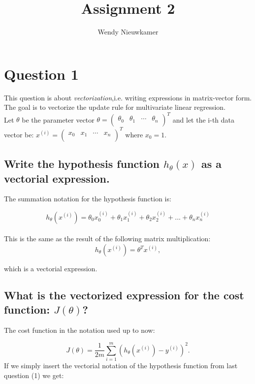 \documentclass{article}
\title {Assignment 2}
\date{}
\author{Wendy Nieuwkamer}
\begin{document}
\maketitle

\section{Question 1}
This question is about \textit{vectorization},i.e. writing expressions
in matrix-vector form. The goal is to vectorize the update rule
for multivariate linear regression.\\

Let $\theta$ be the parameter vector $\theta = \begin{pmatrix} \theta_0 & \theta_1 & \cdots & \theta_n \\ \end{pmatrix} ^T$ and let the i-th data vector be: $ x^{(i)} = \begin{pmatrix} x_0 & x_1 & \cdots & x_n \\\end{pmatrix}^T$ where $ x_0 = 1$.

\subsection{Write the hypothesis function $h_\theta(x)$ as a vectorial expression.}

The summation notation for the hypothesis function is:

\begin{equation*}
	h_\theta (x^{(i)}) = \theta_0 x_0^{(i)} + \theta_1 x_1^{(i)}+ \theta_2 x_2^{(i)}+ ... + \theta_n x_n^{(i)}
\end{equation*}\\

This is the same as the result of the following matrix multiplication:
\begin{equation}
	h_\theta (x^{(i)}) = \theta^T x^{(i)},
\end{equation}

which is a vectorial expression.

\subsection{What is the vectorized expression for the cost function: $J(\theta)$?}
The cost function in the notation used up to now:

\begin{equation*}
		J(\theta) = \frac{1}{2m} \sum\limits_{i=1}^m (h _{\theta} (x ^{(i)}) - y ^{(i)})^2.
\end{equation*}
If we simply insert the vectorial notation of the hypothesis function from last question (1) we get:
\end{document}
